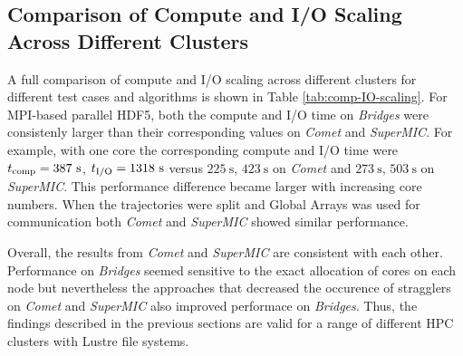 \subsection{Comparison of Compute and I/O Scaling Across Different Clusters}
A full comparison of compute and I/O scaling across different clusters for different test cases and algorithms is shown in Table \ref{tab:comp-IO-scaling}. 
For MPI-based parallel HDF5, both the compute and I/O time on \emph{Bridges} were consistenly larger than their corresponding values on \emph{Comet} and \emph{SuperMIC}.
For example, with one core the corresponding compute and I/O time were ${t}_{\text{comp}} = 387~\text{s}$, ${t}_{\text{I/O}} = 1318~\text{s}$ versus $225~\text{s}$, $423~\text{s}$ on \emph{Comet} and $273~\text{s}$, $503~\text{s}$ on \emph{SuperMIC}.
This performance difference became larger with increasing core numbers.
When the trajectories were split and Global Arrays was used for communication both \emph{Comet} and \emph{SuperMIC} showed similar performance.

Overall, the results from \emph{Comet} and \emph{SuperMIC} are consistent with each other.
Performance on \emph{Bridges} seemed sensitive to the exact allocation of cores on each node but nevertheless the approaches that decreased the occurence of stragglers on \emph{Comet} and \emph{SuperMIC} also improved performace on \emph{Bridges}.
Thus, the findings described in the previous sections are valid for a range of different HPC clusters with Lustre file systems.

